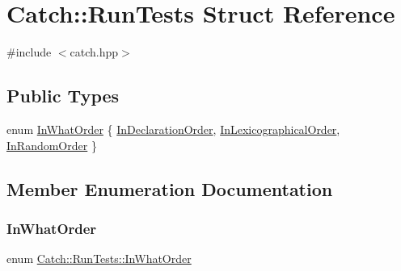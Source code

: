 \hypertarget{struct_catch_1_1_run_tests}{}\section{Catch\+:\+:Run\+Tests Struct Reference}
\label{struct_catch_1_1_run_tests}


{\ttfamily \#include $<$catch.\+hpp$>$}

\subsection*{Public Types}
\begin{DoxyCompactItemize}
\item 
enum \mbox{\hyperlink{struct_catch_1_1_run_tests_ab56bd851b1dd085869992d1a9d73dc5d}{In\+What\+Order}} \{ \mbox{\hyperlink{struct_catch_1_1_run_tests_ab56bd851b1dd085869992d1a9d73dc5da732a98670b4661d80d8c392784a14f09}{In\+Declaration\+Order}}, 
\mbox{\hyperlink{struct_catch_1_1_run_tests_ab56bd851b1dd085869992d1a9d73dc5da8c62a42e94d867c708b421322b1c386f}{In\+Lexicographical\+Order}}, 
\mbox{\hyperlink{struct_catch_1_1_run_tests_ab56bd851b1dd085869992d1a9d73dc5da262441c5b5391b628ca6930c3ba028a5}{In\+Random\+Order}}
 \}
\end{DoxyCompactItemize}


\subsection{Member Enumeration Documentation}
\mbox{\label{struct_catch_1_1_run_tests_ab56bd851b1dd085869992d1a9d73dc5d}} 
\subsubsection{\texorpdfstring{In\+What\+Order}{InWhatOrder}}
{\footnotesize\ttfamily enum \mbox{\hyperlink{struct_catch_1_1_run_tests_ab56bd851b1dd085869992d1a9d73dc5d}{Catch\+::\+Run\+Tests\+::\+In\+What\+Order}}}

